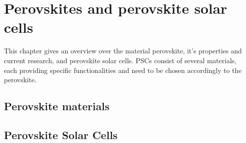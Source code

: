 
\chapter{Perovskites and perovskite solar cells}
This chapter gives an overview over the material perovskite, it's properties and current research, and perovskite solar cells. PSCs consist of several materials, each providing specific functionalities and need to be chosen accordingly to the perovskite.
\section{Perovskite materials}

\section{Perovskite Solar Cells}
